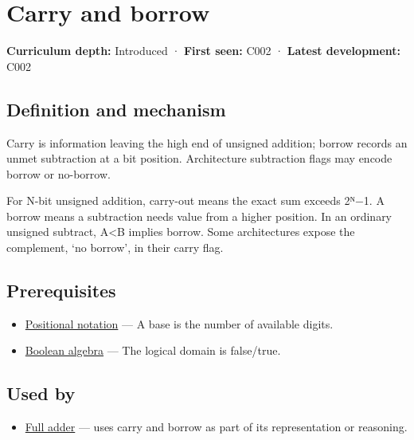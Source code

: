 \hypertarget{appendix-d52d5f78ffd1}{}\label{referencestart:appendix-d52d5f78ffd1}
\section{Carry and borrow}\label{appendix-d52d5f78ffd1-carry-and-borrow}

\textbf{Curriculum depth:} Introduced · \textbf{First seen:} C002 · \textbf{Latest development:} C002

\begin{allmightroledefinition}

\subsection{Definition and mechanism}\label{appendix-d52d5f78ffd1-definition-and-mechanism}

Carry is information leaving the high end of unsigned addition; borrow records an unmet subtraction at a bit position. Architecture subtraction flags may encode borrow or no-borrow.

\end{allmightroledefinition}

For N-bit unsigned addition, carry-out means the exact sum exceeds 2ᴺ−1. A borrow means a subtraction needs value from a higher position. In an ordinary unsigned subtract, A\textless B implies borrow. Some architectures expose the complement, `no borrow', in their carry flag.

\subsection{Prerequisites}\label{appendix-d52d5f78ffd1-prerequisites}

\begin{itemize}
\tightlist
\item
  \hyperref[appendix-83c3f28f7bda]{Positional notation} --- A base is the number of available digits.
\item
  \hyperref[appendix-24475e1596a8]{Boolean algebra} --- The logical domain is false/true.
\end{itemize}

\subsection{Used by}\label{appendix-d52d5f78ffd1-used-by}

\begin{itemize}
\tightlist
\item
  \hyperref[appendix-d1a5b1e520c2]{Full adder} --- uses carry and borrow as part of its representation or reasoning.
\end{itemize}

